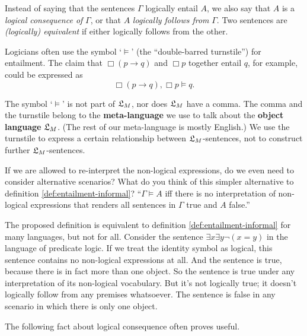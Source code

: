 Instead of saying that the sentences $\Gamma$ logically entail $A$, we also say
that $A$ is a \emph{logical consequence of} $\Gamma$, or that $A$
\emph{logically follows from} $\Gamma$. Two sentences are \emph{(logically)
  equivalent} if either logically follows from the other.

Logicians often use the symbol `$\models$' (the ``double-barred turnstile'') for
entailment. The claim that $\Box (p \to q)$ and $\Box p$ together entail $q$,
for example, could be expressed as
\begin{equation*}
  \Box (p \to q), \Box p \models q.
\end{equation*}

The symbol `$\models$' is not part of $\mathfrak{L}_M$, nor does $\mathfrak{L}_M$ have a comma. The
comma and the turnstile belong to the \textbf{meta-language} we use to talk
about the \textbf{object language} $\mathfrak{L}_M$. (The rest of our meta-language is
mostly English.) We use the turnstile to express a certain relationship between
$\mathfrak{L}_M$-sentences, not to construct further $\mathfrak{L}_{M}$-sentences.

\begin{exercise}
  If we are allowed to re-interpret the non-logical expressions, do we even need
  to consider alternative scenarios? What do you think of this simpler
  alternative to definition \ref{def:entailment-informal}? ``$\Gamma \models A$
  iff there is no interpretation of non-logical expressions that renders all
  sentences in $\Gamma$ true and $A$ false.''
\end{exercise}
\begin{solution}
  The proposed definition is equivalent to definition
  \ref{def:entailment-informal} for many languages, but not for all. Consider
  the sentence $\exists x \exists y \neg(x = y)$ in the language of predicate
  logic. If we treat the identity symbol as logical, this sentence contains no
  non-logical expressions at all. And the sentence is true, because there is in
  fact more than one object. So the sentence is true under any interpretation of
  its non-logical vocabulary. But it's not logically true; it doesn’t logically
  follow from any premises whatsoever. The sentence is false in any scenario in
  which there is only one object.
\end{solution}

The following fact about logical consequence often proves useful.

